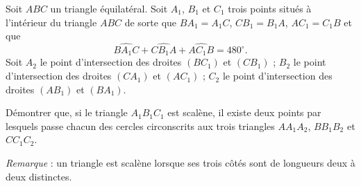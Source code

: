 Soit $ABC$ un triangle équilatéral. Soit $A_1$, $B_1$ et $C_1$ trois points situés à l'intérieur du
triangle $ABC$ de sorte que $BA_1 = A_1C$, $CB_1 = B_1A$, $AC_1 = C_1B$ et que
\[
\widehat{BA_1C} + \widehat{CB_1A} + \widehat{AC_1B} = 480^\circ.
\]
Soit $A_2$ le point d'intersection des droites $(BC_1)$ et $(CB_1)$ ; $B_2$ le point d'intersection des
droites $(CA_1)$ et $(AC_1)$ ; $C_2$ le point d'intersection des droites $(AB_1)$ et $(BA_1)$.

Démontrer que, si le triangle $A_1B_1C_1$ est scalène, il existe deux points par lesquels passe chacun des
cercles circonscrits aux trois triangles $AA_1A_2$, $BB_1B_2$ et $CC_1C_2$.

\emph{Remarque} : un triangle est scalène lorsque ses trois côtés sont de longueurs deux à deux distinctes.

